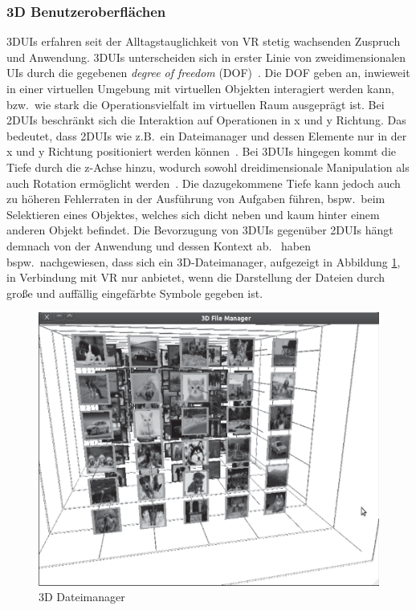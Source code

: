 \subsubsection{3D Benutzeroberflächen}
3DUIs erfahren seit der Alltagstauglichkeit von VR stetig wachsenden Zuspruch und Anwendung. 3DUIs unterscheiden sich in erster Linie von zweidimensionalen UIs durch die gegebenen \textit{degree of freedom} (DOF)~\cite{whatuserinterfacetouse,asurveyon3dobjectmanipulation,theoryandpracticebook}. Die DOF geben an, inwieweit in einer virtuellen Umgebung mit virtuellen Objekten interagiert werden kann, bzw.~wie stark die Operationsvielfalt im virtuellen Raum ausgeprägt ist. Bei 2DUIs beschränkt sich die Interaktion auf Operationen in x und y Richtung. Das bedeutet, dass 2DUIs wie z.B.~ein Dateimanager und dessen Elemente nur in der x und y Richtung positioniert werden können~\cite{issuesandbenefitsofusing3d}. Bei 3DUIs hingegen kommt die Tiefe durch die z-Achse hinzu, wodurch sowohl dreidimensionale Manipulation als auch Rotation ermöglicht werden~\cite{anintroductionto3dspacial}. Die dazugekommene Tiefe kann jedoch auch zu höheren Fehlerraten in der Ausführung von Aufgaben führen, bspw.~beim Selektieren eines Objektes, welches sich dicht neben und kaum hinter einem anderen Objekt befindet. Die Bevorzugung von 3DUIs gegenüber 2DUIs hängt demnach von der Anwendung und dessen Kontext ab.~\cite{issuesandbenefitsofusing3d} haben bspw.~nachgewiesen, dass sich ein 3D-Dateimanager, aufgezeigt in Abbildung \ref{fig:3dinterface}, in Verbindung mit VR nur anbietet, wenn die Darstellung der Dateien durch große und auffällig eingefärbte Symbole gegeben ist.

\begin{figure}[h]
\captionsetup{width=.7\linewidth}
\includegraphics[scale=0.75]{Bilder/Hauptteil/3duserinterface}
\centering
\caption{3D Dateimanager~\cite[p.~243]{issuesandbenefitsofusing3d}}
\label{fig:3dinterface}
\end{figure}

